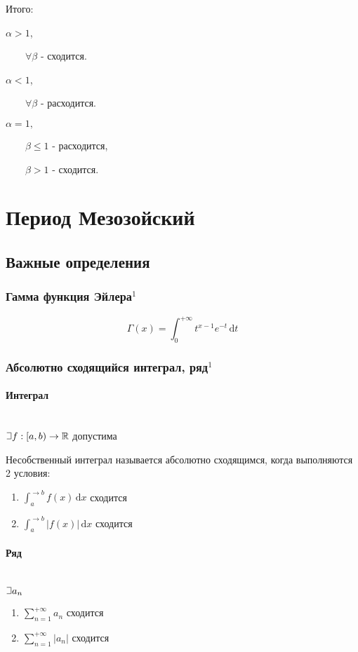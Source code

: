 \documentclass{article}
\def\letus{%
\mathord{\setbox0=\hbox{$\exists$}%
         \hbox{\kern 0.125\wd0%
               \vbox to \ht0{%
                  \hrule width 0.75\wd0%
                  \vfill%
                  \hrule width 0.75\wd0}%
               \vrule height \ht0%
               \kern 0.125\wd0}%
       }%
        }
\def\D{\,\mathrm{d}}
\let\vanillaparagraph\paragraph
\renewcommand{\paragraph}[1]{\vanillaparagraph{#1}\mbox{}\\}
\begin{document}
Итого:

$\alpha > 1$, 

    $\qquad \forall \beta$ - сходится.

$\alpha < 1$,

    $\qquad \forall \beta$ - расходится.

$\alpha = 1,\quad $

    $\qquad \beta \leq 1$ - расходится, 

    $\qquad \beta > 1$ - сходится.

\section{Период Мезозойский}
\subsection{Важные определения}
\subsubsection{Гамма функция Эйлера\texorpdfstring{$^1$}{}}
$$
\Gamma(x) = \int^{+\infty}_0 t^{x-1} e^{-t} \D t
$$

\subsubsection{Абсолютно сходящийся интеграл, ряд\texorpdfstring{$^1$}{}}
\paragraph{Интеграл}
$\letus f: [ a, b ) \rightarrow \mathbb{R} $ допустима

Несобственный интеграл называется абсолютно сходящимся, когда выполняются 2 условия:
\begin{enumerate}
    \item $\int_a^{\rightarrow b} f(x) \D x$ сходится
    \item $\int_a^{\rightarrow b} |f(x)| \D x$ сходится
\end{enumerate}

\paragraph{Ряд}
$\letus a_n$
\begin{enumerate}
    \item $\sum_{n=1}^{+\infty} a_n$ сходится
    \item $\sum_{n=1}^{+\infty} |a_n|$ сходится
\end{enumerate}
\end{document}
